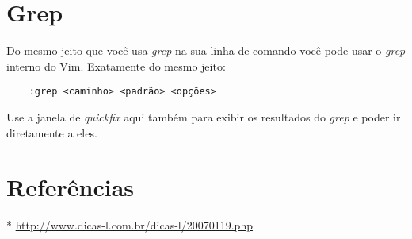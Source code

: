 \section{Grep}

Do mesmo jeito que você usa {\em grep} na sua linha de comando você pode usar
o {\em grep} interno do Vim. Exatamente do mesmo jeito:

\begin{verbatim}
 	:grep <caminho> <padrão> <opções>
\end{verbatim}

Use a janela de {\em quickfix} aqui também para exibir os resultados do {\em
grep} e poder ir diretamente 
a eles.

\section{Referências}
* \url{http://www.dicas-l.com.br/dicas-l/20070119.php}

